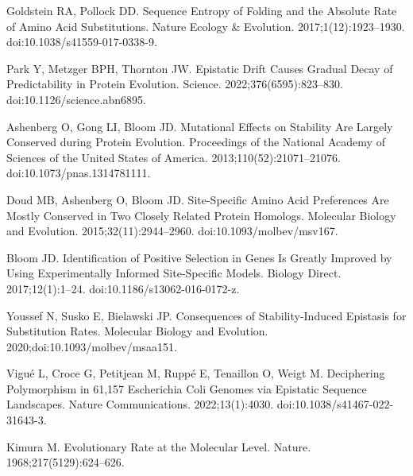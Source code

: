 \documentclass{article}
\begin{document}
\begin{thebibliography}{10}
        Goldstein RA, Pollock DD.
        \newblock Sequence Entropy of Folding and the Absolute Rate of Amino Acid
        Substitutions.
        \newblock Nature Ecology \& Evolution. 2017;1(12):1923--1930.
        \newblock doi:{10.1038/s41559-017-0338-9}.

        Park Y, Metzger BPH, Thornton JW.
        \newblock Epistatic Drift Causes Gradual Decay of Predictability in Protein
        Evolution.
        \newblock Science. 2022;376(6595):823--830.
        \newblock doi:{10.1126/science.abn6895}.

        Ashenberg O, Gong LI, Bloom JD.
        \newblock Mutational Effects on Stability Are Largely Conserved during Protein
        Evolution.
        \newblock Proceedings of the National Academy of Sciences of the United States
        of America. 2013;110(52):21071--21076.
        \newblock doi:{10.1073/pnas.1314781111}.

        Doud MB, Ashenberg O, Bloom JD.
        \newblock Site-{{Specific Amino Acid Preferences Are Mostly Conserved}} in
            {{Two Closely Related Protein Homologs}}.
        \newblock Molecular Biology and Evolution. 2015;32(11):2944--2960.
        \newblock doi:{10.1093/molbev/msv167}.

        Bloom JD.
        \newblock Identification of Positive Selection in Genes Is Greatly Improved by
        Using Experimentally Informed Site-Specific Models.
        \newblock Biology Direct. 2017;12(1):1--24.
        \newblock doi:{10.1186/s13062-016-0172-z}.

        Youssef N, Susko E, Bielawski JP.
        \newblock Consequences of Stability-Induced Epistasis for Substitution Rates.
        \newblock Molecular Biology and Evolution. 2020;doi:{10.1093/molbev/msaa151}.

        Vigu{\'e} L, Croce G, Petitjean M, Rupp{\'e} E, Tenaillon O, Weigt M.
        \newblock Deciphering Polymorphism in 61,157 {{Escherichia}} Coli Genomes via
        Epistatic Sequence Landscapes.
        \newblock Nature Communications. 2022;13(1):4030.
        \newblock doi:{10.1038/s41467-022-31643-3}.

        Kimura M.
        \newblock Evolutionary Rate at the Molecular Level.
        \newblock Nature. 1968;217(5129):624--626.


\end{thebibliography}
\end{document}
